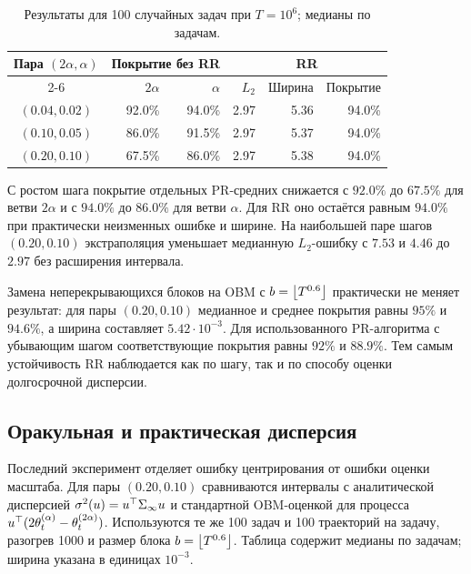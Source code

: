 \documentclass[blind]{psta}
\begin{document}
\begin{table}
\scriptsize
\setlength{\tabcolsep}{2.5pt}
\renewcommand{\arraystretch}{1.18}
\caption{Результаты для 100 случайных задач при $T=10^6$; медианы по
задачам.}
\label{tab:sweep}
\centering
\begin{tabular}{|c|r|r|r|r|r|}
\hline
Пара $(2\alpha,\alpha)$ &
\multicolumn{2}{c|}{Покрытие без RR} &
\multicolumn{3}{c|}{RR} \\
\cline{2-6}
 & $2\alpha$ & $\alpha$ & $L_2$ & Ширина & Покрытие \\
\hline
$(0.04,0.02)$ & 92.0\% & 94.0\% & 2.97 & 5.36 & 94.0\% \\
$(0.10,0.05)$ & 86.0\% & 91.5\% & 2.97 & 5.37 & 94.0\% \\
$(0.20,0.10)$ & 67.5\% & 86.0\% & 2.97 & 5.38 & 94.0\% \\
\hline
\end{tabular}
\end{table}

С ростом шага покрытие отдельных PR-средних снижается с $92.0\%$ до $67.5\%$
для ветви $2\alpha$ и с $94.0\%$ до $86.0\%$ для ветви $\alpha$. Для RR оно
остаётся равным $94.0\%$ при практически неизменных ошибке и ширине. На
наибольшей паре шагов $(0.20,0.10)$ экстраполяция уменьшает медианную
$L_2$-ошибку с $7.53$ и $4.46$ до $2.97$ без расширения интервала.

Замена неперекрывающихся блоков на OBM с $b=\left\lfloor T^{0.6} \right\rfloor$ практически не
меняет результат: для пары $(0.20,0.10)$ медианное и среднее покрытия равны
$95\%$ и $94.6\%$, а ширина составляет $5.42\cdot10^{-3}$. Для
использованного PR-алгоритма с убывающим шагом соответствующие покрытия равны
$92\%$ и $88.9\%$. Тем самым устойчивость RR наблюдается как по шагу, так и
по способу оценки долгосрочной дисперсии.

\subsection{Оракульная и практическая дисперсия}

Последний эксперимент отделяет ошибку центрирования от ошибки оценки
масштаба. Для пары $(0.20,0.10)$ сравниваются интервалы с аналитической
дисперсией $\sigma^2(u)=u^\top\Sigma_\infty u$ и стандартной OBM-оценкой
для процесса
$u^\top(2\theta_t^{(\alpha)}-\theta_t^{(2\alpha)})$. Используются те же
100 задач и 100 траекторий на задачу, разогрев 1000 и размер блока
$b=\left\lfloor T^{0.6} \right\rfloor$. Таблица содержит медианы по задачам; ширина указана в
единицах $10^{-3}$.
\end{document}
